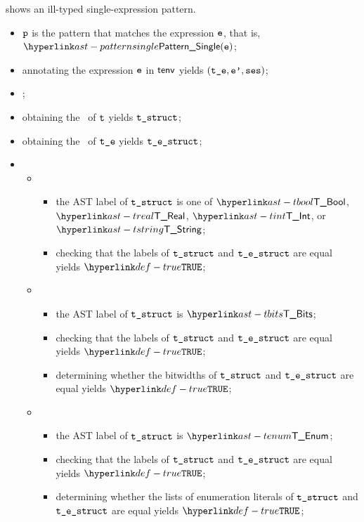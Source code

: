 shows an ill-typed single-expression pattern.

\ProseParagraph
\AllApply
\begin{itemize}
  \item $\texttt{p}$ is the pattern that matches the expression $\texttt{e}$, that is, $\PatternSingle(\ve)$;
  \item annotating the expression $\texttt{e}$ in $\textsf{tenv}$ yields $(\texttt{t\_e}, \texttt{e'}, \texttt{ses})$\ProseOrTypeError;
  \item \Prosechecksymbolicallyevaluable{$\vses$};
  \item obtaining the \underlyingtype\ of $\texttt{t}$ yields $\texttt{t\_struct}$\ProseOrTypeError;
  \item obtaining the \underlyingtype\ of $\texttt{t\_e}$ yields $\texttt{t\_e\_struct}$\ProseOrTypeError;
  \item \OneApplies
  \begin{itemize}
    \item {}
    \begin{itemize}
      \item the AST label of $\texttt{t\_struct}$ is one of $\TBool$, $\TReal$, $\TInt$, or $\TString$;
      \item checking that the labels of $\texttt{t\_struct}$ and $\texttt{t\_e\_struct}$ are equal yields $\True$\ProseOrTypeError;
    \end{itemize}

    \item {}
    \begin{itemize}
      \item the AST label of $\texttt{t\_struct}$ is $\TBits$;
      \item checking that the labels of $\texttt{t\_struct}$ and $\texttt{t\_e\_struct}$ are equal yields $\True$\ProseOrTypeError;
      \item determining whether the bitwidths of $\texttt{t\_struct}$ and $\texttt{t\_e\_struct}$ are equal yields $\True$\ProseOrTypeError;
    \end{itemize}

    \item {}
    \begin{itemize}
      \item the AST label of $\texttt{t\_struct}$ is $\TEnum$;
      \item checking that the labels of $\texttt{t\_struct}$ and $\texttt{t\_e\_struct}$ are equal yields $\True$\ProseOrTypeError;
      \item determining whether the lists of enumeration literals of $\texttt{t\_struct}$ and $\texttt{t\_e\_struct}$ are equal yields $\True$\ProseOrTypeError;
    \end{itemize}


\end{itemize}
\end{itemize}
